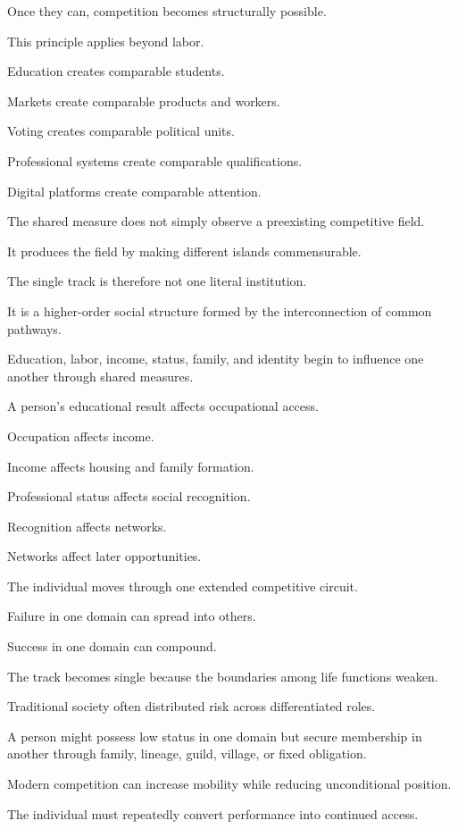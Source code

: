 Once they can, competition becomes structurally possible.

This principle applies beyond labor.

Education creates comparable students.

Markets create comparable products and workers.

Voting creates comparable political units.

Professional systems create comparable qualifications.

Digital platforms create comparable attention.

The shared measure does not simply observe a preexisting competitive field.

It produces the field by making different islands commensurable.

The single track is therefore not one literal institution.

It is a higher-order social structure formed by the interconnection of common pathways.

Education, labor, income, status, family, and identity begin to influence one another through shared measures.

A person’s educational result affects occupational access.

Occupation affects income.

Income affects housing and family formation.

Professional status affects social recognition.

Recognition affects networks.

Networks affect later opportunities.

The individual moves through one extended competitive circuit.

Failure in one domain can spread into others.

Success in one domain can compound.

The track becomes single because the boundaries among life functions weaken.

Traditional society often distributed risk across differentiated roles.

A person might possess low status in one domain but secure membership in another through family, lineage, guild, village, or fixed obligation.

Modern competition can increase mobility while reducing unconditional position.

The individual must repeatedly convert performance into continued access.

